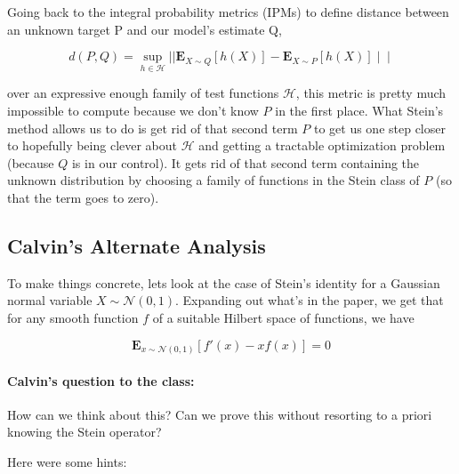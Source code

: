 \documentclass[12pt]{article}
\begin{document}
\noindent Going back to the integral probability metrics (IPMs) to define distance between an unknown target P and our model's estimate Q,

\begin{equation}
    d(P,Q) = \sup_{h \in \mathcal{H}} || \mathbf{E}_{X \sim Q}[h(X)] - \mathbf{E}_{X \sim P}[h(X)] ∣∣
\end{equation}

\noindent over an expressive enough family of test functions $\mathcal{H}$, this metric is pretty much impossible to compute because we don't know $P$ in the first place. What Stein's method allows us to do is get rid of that second term $P$ to get us one step closer to hopefully being clever about $\mathcal{H}$ and getting a tractable optimization problem (because $Q$ is in our control). It gets rid of that second term containing the unknown distribution by choosing a family of functions in the Stein class of $P$ (so that the term goes to zero).

\subsection{Calvin's Alternate Analysis}

To make things concrete, lets look at the case of Stein's identity for a Gaussian normal variable $X \sim \mathcal{N}(0,1)$. Expanding out what's in the paper, we get that for any smooth function $f$ of a suitable Hilbert space of functions, we have

\begin{equation}
    \mathbf{E}_{x \sim \mathcal{N}(0,1)}[f'(x) - xf(x)]=0
\end{equation}

 

\paragraph{Calvin's question to the class:} How can we think about this? Can we prove this without resorting to a priori knowing the Stein operator?

Here were some hints:
\end{document}
